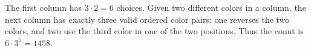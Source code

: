The first column has $3\cdot2=6$ choices. Given two different colors in a column, the next column has exactly three valid ordered color pairs: one reverses the two colors, and two use the third color in one of the two positions. Thus the count is $6\cdot3^5=\boxed{1458}$.
